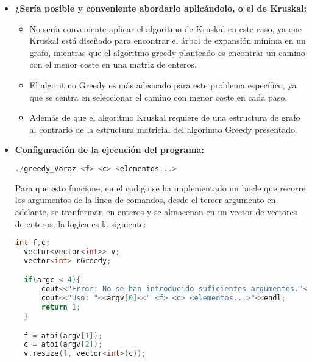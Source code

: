 \documentclass[12pt, letterpaper]{article}
\begin{document}
\begin{itemize}
        \item\textbf{¿Sería posible y conveniente abordarlo aplicándolo, o el de Kruskal:}
          \begin{itemize}
            \item No sería conveniente aplicar el algoritmo de Kruskal en este caso, ya que Kruskal está diseñado para encontrar el árbol de expansión mínima en un grafo, 
            mientras que el algoritmo greedy planteado es encontrar un camino con el menor coste en una matriz de enteros.
            \item El algoritmo Greedy es más adecuado para este problema específico, ya que se centra en seleccionar el camino con menor coste en cada paso.
            \item Además de que el algoritmo Kruskal requiere de una estructura de grafo al contrario de la estructura matricial del algorimto Greedy presentado.
          \end{itemize}
  \newpage %

        \item\textbf{Configuración de la ejecución del programa: }
          \begin{lstlisting}[language=C++, basicstyle=\ttfamily\footnotesize]
            ./greedy_Voraz <f> <c> <elementos...>
          \end{lstlisting}
          Para que esto funcione, en el codigo se ha implementado un bucle que recorre los argumentos de la linea de comandos, desde el tercer argumento en adelante, 
          se tranforman en enteros y se almacenan en un vector de vectores de enteros, la logica es la siguiente:
          \begin{lstlisting}[language=C++, basicstyle=\ttfamily\footnotesize]
  int f,c;
  vector<vector<int>> v;
  vector<int> rGreedy;

  if(argc < 4){
      cout<<"Error: No se han introducido suficientes argumentos."<<endl;
      cout<<"Uso: "<<argv[0]<<" <f> <c> <elementos...>"<<endl;
      return 1;
  }

  f = atoi(argv[1]);
  c = atoi(argv[2]);
  v.resize(f, vector<int>(c));


\end{lstlisting}
\end{itemize}
\end{document}
